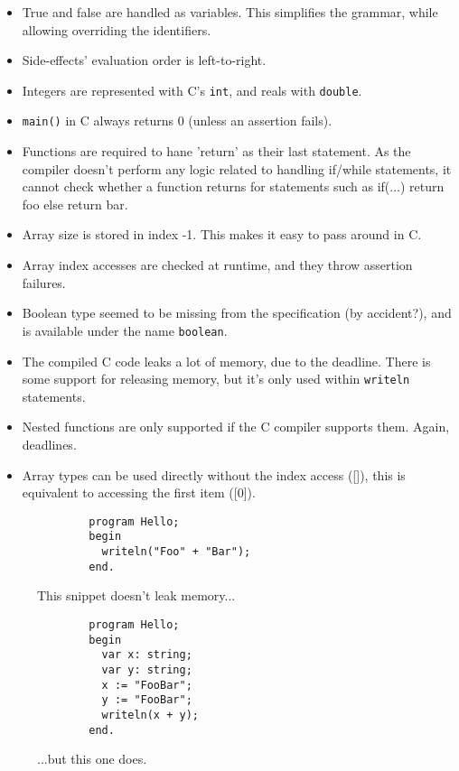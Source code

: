 \documentclass{article}
\def\pascallexer{pascal.py:DelphiLexer -x}
\begin{document}
\begin{itemize}
    \item True and false are handled as variables. This simplifies the grammar,
        while allowing overriding the identifiers.
    \item Side-effects' evaluation order is left-to-right.
    \item Integers are represented with C's \texttt{int}, and reals with
        \texttt{double}.
    \item \texttt{main()} in C always returns 0 (unless an assertion fails).
    \item Functions are required to hane 'return' as their last statement. As
        the compiler doesn't perform any logic related to handling if/while
        statements, it cannot check whether a function returns for statements
        such as if(...) return foo else return bar.
    \item Array size is stored in index -1. This makes it easy to pass around
        in C.
    \item Array index accesses are checked at runtime, and they throw assertion
        failures.
    \item Boolean type seemed to be missing from the specification (by
        accident?), and is available under the name \texttt{boolean}.
    \item The compiled C code leaks a lot of memory, due to the deadline. There
        is some support for releasing memory, but it's only used within
        \texttt{writeln} statements.
    \item Nested functions are only supported if the C compiler supports them.
        Again, deadlines.
    \item Array types can be used directly without the index access ([]), this
        is equivalent to accessing the first item ([0]).
\end{itemize}

\FloatBarrier

\begin{figure}[ht!]
    \begin{verbatim}
        program Hello;
        begin
          writeln("Foo" + "Bar");
        end.
    \end{verbatim}
    \caption{This snippet doesn't leak memory...}
\end{figure}

\FloatBarrier

\begin{figure}[ht!]
    \begin{verbatim}
        program Hello;
        begin
          var x: string;
          var y: string;
          x := "FooBar";
          y := "FooBar";
          writeln(x + y);
        end.
    \end{verbatim}
    \caption{...but this one does.}
\end{figure}
\end{document}
